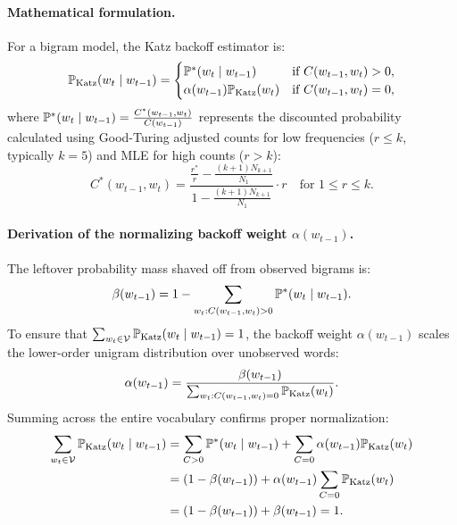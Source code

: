 \documentclass[../../main.tex]{subfiles}
\begin{document}
\paragraph{Mathematical formulation.}
For a bigram model, the Katz backoff estimator is:
\begin{equation}
\label{eq:katz_backoff}
\mathbb{P}_{\text{Katz}}(w_t \mid w_{t-1}) = \begin{cases}
\mathbb{P}^*(w_t \mid w_{t-1}) & \text{if } C(w_{t-1}, w_t) > 0, \\
\alpha(w_{t-1}) \mathbb{P}_{\text{Katz}}(w_t) & \text{if } C(w_{t-1}, w_t) = 0,
\end{cases}
\end{equation}
where $\mathbb{P}^*(w_t \mid w_{t-1}) = \frac{C^*(w_{t-1}, w_t)}{C(w_{t-1})}$ represents the discounted probability calculated using Good-Turing adjusted counts for low frequencies ($r \le k$, typically $k = 5$) and MLE for high counts ($r > k$):
\begin{equation}
\label{eq:katz_cstar}
C^*(w_{t-1}, w_t) = \frac{\frac{r^*}{r} - \frac{(k+1)N_{k+1}}{N_1}}{1 - \frac{(k+1)N_{k+1}}{N_1}} \cdot r \quad \text{for } 1 \le r \le k.
\end{equation}

\paragraph{Derivation of the normalizing backoff weight $\alpha(w_{t-1})$.}
The leftover probability mass shaved off from observed bigrams is:
\begin{equation}
\label{eq:katz_beta}
\beta(w_{t-1}) = 1 - \sum_{w_t : C(w_{t-1}, w_t) > 0} \mathbb{P}^*(w_t \mid w_{t-1}).
\end{equation}
To ensure that $\sum_{w_t \in \mathcal{V}} \mathbb{P}_{\text{Katz}}(w_t \mid w_{t-1}) = 1$, the backoff weight $\alpha(w_{t-1})$ scales the lower-order unigram distribution over unobserved words:
\begin{equation}
\label{eq:katz_alpha}
\alpha(w_{t-1}) = \frac{\beta(w_{t-1})}{\sum_{w_t : C(w_{t-1}, w_t) = 0} \mathbb{P}_{\text{Katz}}(w_t)}.
\end{equation}
Summing across the entire vocabulary confirms proper normalization:
\begin{align}
\sum_{w_t \in \mathcal{V}} \mathbb{P}_{\text{Katz}}(w_t \mid w_{t-1}) &= \sum_{C > 0} \mathbb{P}^*(w_t \mid w_{t-1}) + \sum_{C = 0} \alpha(w_{t-1}) \mathbb{P}_{\text{Katz}}(w_t) \notag \\
&= \left( 1 - \beta(w_{t-1}) \right) + \alpha(w_{t-1}) \sum_{C = 0} \mathbb{P}_{\text{Katz}}(w_t) \notag \\
&= \left( 1 - \beta(w_{t-1}) \right) + \beta(w_{t-1}) = 1. \label{eq:katz_proof}
\end{align}
\end{document}
